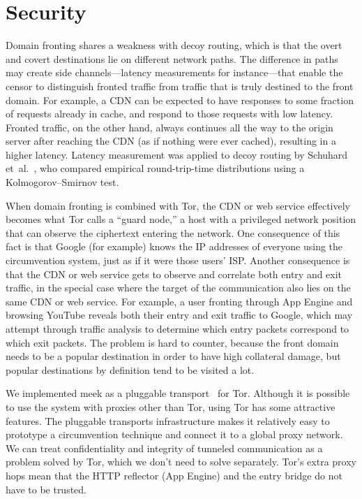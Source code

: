 \documentclass[conference]{IEEEtran}
\begin{document}
\section{Security}
\label{sec:security}

Domain fronting shares a weakness with decoy routing,
which is that the overt and covert destinations lie on different
network paths.
The difference in paths may create side channels---latency measurements for instance---that
enable the censor to
distinguish fronted traffic from traffic that is truly destined
to the front domain.
For example, a CDN can be expected to have responses
to some fraction of requests already in cache,
and respond to those requests with low latency.
Fronted traffic, on the other hand, always continues all the way
to the origin server after reaching the CDN (as if nothing were ever cached),
resulting in a higher latency.
Latency measurement was applied to decoy routing by Schuhard et~al.~\cite[Section~5]{ccs2012-decoys},
who compared empirical round-trip-time distributions using a
Kolmogorov--Smirnov test.

When domain fronting is combined with Tor,
the CDN or web service effectively becomes
what Tor calls a ``guard node,''
a host with a privileged network position that can observe
the ciphertext entering the network.
One consequence of this fact is that Google (for example)
knows the IP addresses of everyone using the circumvention system,
just as if it were those users' ISP.
Another consequence is that the CDN or web service gets
to observe and correlate both entry and exit traffic,
in the special case where the target of the communication
also lies on the same CDN or web service.
For example, a user fronting through App Engine and
browsing YouTube reveals both their entry and exit traffic to Google,
which may attempt through traffic analysis to determine
which entry packets correspond to which exit packets.
The problem is hard to counter, because the front domain needs
to be a popular destination in order to have high collateral damage,
but popular destinations by definition tend to be visited a lot.

We implemented meek as a pluggable transport~\cite{pt} for Tor.
Although it is possible to use the system with proxies other than Tor,
using Tor has some attractive features.
The pluggable transports infrastructure makes it relatively easy to prototype
a circumvention technique and connect it to a global proxy network.
We can treat confidentiality and integrity of tunneled communication
as a problem solved by Tor, which we don't need to solve separately.
Tor's extra proxy hops mean that the HTTP reflector (App Engine)
and the entry bridge do not have to be trusted.
\end{document}

